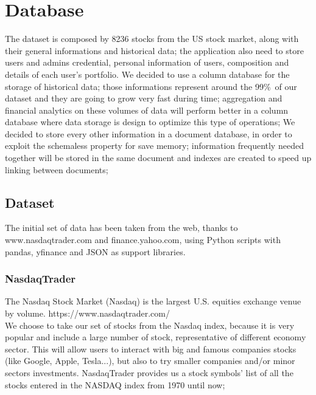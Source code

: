 \chapter{Database}

The dataset is composed by 8236 stocks from the US stock market, along with
their general informations and historical data; the application also need to store 
users and admins credential, personal information of users, composition and details of
each user's portfolio.
We decided to use a column database for the storage of historical data; those 
informations represent around the 99\%\ of our dataset and they are going to grow very fast
during time; aggregation and financial analytics on these volumes of data will perform
better in a column database where data storage is design to optimize this type of operations;
We decided to store every other information in a document database, in order to exploit the
schemaless property for save memory; information frequently needed together will be stored 
in the same document and indexes are created to speed up linking between documents; 


\section{Dataset}
The initial set of data has been taken from the web, thanks to www.nasdaqtrader.com
and finance.yahoo.com, using Python scripts with pandas, yfinance and JSON as support
libraries.
\subsection{NasdaqTrader}
The Nasdaq Stock Market (Nasdaq) is the largest U.S. equities exchange venue by volume. 
https://www.nasdaqtrader.com/ \\
We choose to take our set of stocks from the Nasdaq index, because it is very popular and
include a large number of stock, representative of different economy sector. This will allow 
users to interact with big and famous companies stocks (like Google, Apple, Tesla...), but also
to try smaller companies and/or minor sectors investments. 
NasdaqTrader provides us a stock symbols' list of all the stocks entered in the NASDAQ index
from 1970 until now;
